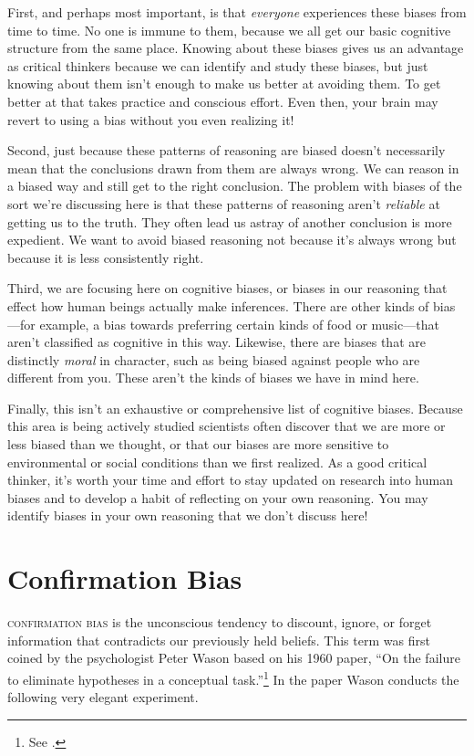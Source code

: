 First, and perhaps most important, is that \emph{everyone} experiences these biases from time to time. No one is immune to them, because we all get our basic cognitive structure from the same place. Knowing about these biases gives us an advantage as critical thinkers because we can identify and study these biases, but just knowing about them isn't enough to make us better at avoiding them. To get better at that takes practice and conscious effort. Even then, your brain may revert to using a bias without you even realizing it!

Second, just because these patterns of reasoning are biased doesn't necessarily mean that the conclusions drawn from them are always wrong. We can reason in a biased way and still get to the right conclusion. The problem with biases of the sort we're discussing here is that these patterns of reasoning aren't \emph{reliable} at getting us to the truth. They often lead us astray of another conclusion is more expedient. We want to avoid biased reasoning not because it's always wrong but because it is less consistently right.

Third, we are focusing here on cognitive biases, or biases in our reasoning that effect how human beings actually make inferences. There are other kinds of bias---for example, a bias towards preferring certain kinds of food or music---that aren't classified as cognitive in this way. Likewise, there are biases that are distinctly \emph{moral} in character, such as being biased against people who are different from you. These aren't the kinds of biases we have in mind here.

Finally, this isn't an exhaustive or comprehensive list of cognitive biases. Because this area is being actively studied scientists often discover that we are more or less biased than we thought, or that our biases are more sensitive to environmental or social conditions than we first realized. As a good critical thinker, it's worth your time and effort to stay updated on research into human biases and to develop a habit of reflecting on your own reasoning. You may identify biases in your own reasoning that we don't discuss here!

\section{Confirmation Bias}

\textsc{\Gls{confirmation bias}} is the unconscious tendency to discount, ignore, or forget information that contradicts our previously held beliefs. This term was first coined by the psychologist Peter Wason based on his 1960 paper, ``On the failure to eliminate hypotheses in a conceptual task.''\footnote{See \cite{wason1960}.} In the paper Wason conducts the following very elegant experiment.

